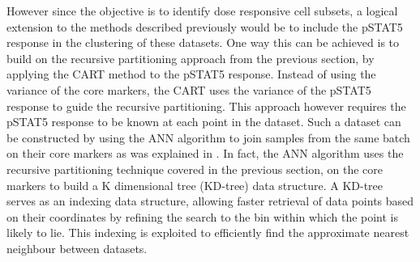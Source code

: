 However since the objective is to identify dose responsive cell subsets,
a logical extension to the methods described previously would be to include the pSTAT5 response
in the clustering of these datasets. 
One way this can be achieved is to build on the recursive partitioning approach from the previous section,
by applying the \acrfull{CART} method to the pSTAT5 response.
Instead of using the variance of the core markers, the \gls{CART} uses the variance of the pSTAT5 response to guide the recursive
partitioning.
This approach however requires the pSTAT5 response to be known at each point in the dataset.
Such a dataset can be constructed by using the \gls{ANN} algorithm to join samples from the same batch on their core markers
as was explained in .
In fact, the \gls{ANN} algorithm uses the recursive partitioning technique covered in the previous section, on the core markers
to build a K dimensional tree (KD-tree) data structure.
A KD-tree
serves as an indexing data structure,
allowing faster retrieval of data points based on their coordinates
by refining the search to the bin within which the point is likely to lie.
This indexing is exploited to efficiently find the approximate nearest neighbour between datasets.

